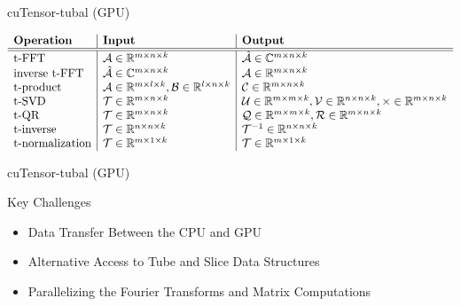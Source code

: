 \documentclass[t, 10pt, handout, aspectratio=169]{beamer}
\begin{document}
\begin{frame}{cuTensor-tubal (GPU)}

\begin{table}
$\begin{array}{l | l | l}
\textbf{Operation} & \textbf{Input} & \textbf{Output} \\
\hline \hline
\text{t-FFT} & \mathcal{A}\in\mathbb{R}^{m\times n\times k} & \hat{\mathcal{A}}\in\mathbb{C}^{m\times n\times k} \\
\text{inverse t-FFT} & \hat{\mathcal{A}}\in\mathbb{C}^{m\times n\times k} & \mathcal{A}\in\mathbb{R}^{m\times n\times k} \\
\text{t-product} & \mathcal{A}\in\mathbb{R}^{m\times l\times k},\mathcal{B}\in\mathbb{R}^{l\times n\times k} & \mathcal{C}\in\mathbb{R}^{m\times n\times k} \\
\text{t-SVD} & \mathcal{T}\in\mathbb{R}^{m\times n\times k} & \mathcal{U}\in\mathbb{R}^{m\times m\times k},\mathcal{V}\in\mathbb{R}^{n\times n\times k}, \mathcal{\Theta}\in\mathbb{R}^{m\times n\times k} \\
\text{t-QR} & \mathcal{T}\in\mathbb{R}^{m\times n\times k} & \mathcal{Q}\in\mathbb{R}^{m\times m\times k}, \mathcal{R}\in\mathbb{R}^{m\times n\times k} \\
\text{t-inverse} &\mathcal{T}\in\mathbb{R}^{n\times n\times k} &\mathcal{T}^{-1}\in\mathbb{R}^{n\times n\times k} \\
\text{t-normalization} & \mathcal{T}\in\mathbb{R}^{m\times 1\times k} & \mathcal{T}\in\mathbb{R}^{m\times 1\times k}
\end{array}$
\caption{Seven tensor operations in the cuTensor-tubal library}
\end{table}
\end{frame}

\begin{frame}{cuTensor-tubal (GPU)}
\large
\begin{block}{Key Challenges}

\begin{itemize}
  \item Data Transfer Between the CPU and GPU 
  \item Alternative Access to Tube and Slice Data Structures
  \item Parallelizing the Fourier Transforms and Matrix Computations
\end{itemize}
\end{block}
\end{frame}
\end{document}
